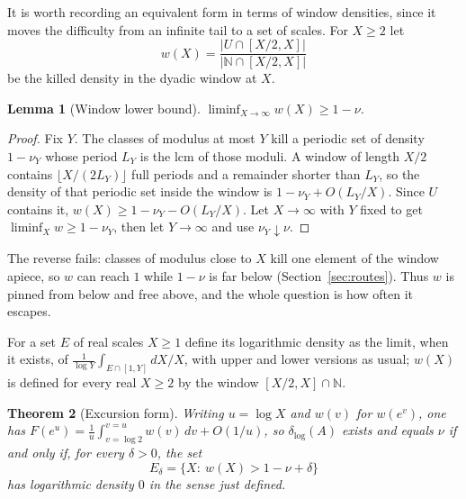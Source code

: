 \documentclass[11pt]{article}
\theoremstyle{plain}
\newtheorem{theorem}{Theorem}[section]
\newtheorem{lemma}[theorem]{Lemma}
\theoremstyle{definition}
\newcommand{\N}{\mathbb{N}}
\newcommand{\dlog}{\delta_{\log}}
\begin{document}
It is worth recording an equivalent form in terms of window
densities, since it moves the difficulty from an infinite tail
to a set of scales.  For $X\ge2$ let
\[
  w(X)=\frac{\bigl|U\cap[X/2,X]\bigr|}{\bigl|\N\cap[X/2,X]\bigr|}
\]
be the killed density in the dyadic window at $X$.

\begin{lemma}[Window lower bound]\label{lem:window}
$\liminf_{X\to\infty}w(X)\ge1-\nu$.
\end{lemma}

\begin{proof}
Fix $Y$.  The classes of modulus at most $Y$ kill a periodic set
of density $1-\nu_Y$ whose period $L_Y$ is the lcm of those
moduli.  A window of length $X/2$ contains
$\lfloor X/(2L_Y)\rfloor$ full periods and a remainder shorter
than $L_Y$, so the density of that periodic set inside the
window is $1-\nu_Y+O(L_Y/X)$.  Since $U$ contains it,
$w(X)\ge1-\nu_Y-O(L_Y/X)$.  Let $X\to\infty$ with $Y$ fixed to
get $\liminf_X w\ge1-\nu_Y$, then let $Y\to\infty$ and use
$\nu_Y\downarrow\nu$.
\end{proof}

The reverse fails: classes of modulus close to $X$ kill one
element of the window apiece, so $w$ can reach $1$ while
$1-\nu$ is far below (Section~\ref{sec:routes}).  Thus $w$ is pinned from below
and free above, and the whole question is how often it escapes.

For a set $E$ of real scales $X\ge1$ define its logarithmic
density as the limit, when it exists, of
$\frac{1}{\log Y}\int_{E\cap[1,Y]}dX/X$, with upper and lower
versions as usual; $w(X)$ is defined for every real $X\ge2$ by
the window $[X/2,X]\cap\N$.

\begin{theorem}[Excursion form]\label{thm:excursion}
Writing $u=\log X$ and $w(v)$ for $w(e^v)$, one has
$F(e^u)=\frac{1}{u}\int_{v=\log 2}^{v=u} w(v)\,dv+O(1/u)$, so $\dlog(A)$ exists
and equals $\nu$ if and only if, for every $\delta>0$, the set
\[
  E_\delta=\{X:\ w(X)>1-\nu+\delta\}
\]
has logarithmic density $0$ in the sense just defined.
\end{theorem}
\end{document}
